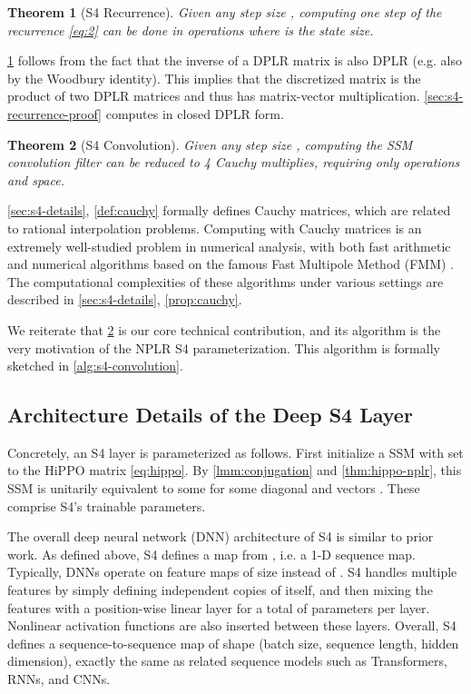 \documentclass{article}
\newtheorem{theorem}{Theorem}
\newcommand{\methodabbrv}{S4}
\begin{document}
\begin{theorem}[\methodabbrv{} Recurrence]\label{thm:s4-recurrence}
  Given any step size , computing one step of the recurrence \eqref{eq:2} can be done in  operations where  is the state size.
\end{theorem}

\cref{thm:s4-recurrence} follows from the fact that the inverse of a DPLR matrix is also DPLR (e.g. also by the Woodbury identity).
This implies that the discretized matrix  is the product of two DPLR matrices and thus has  matrix-vector multiplication.
\cref{sec:s4-recurrence-proof} computes  in closed DPLR form.
\begin{theorem}[\methodabbrv{} Convolution]\label{thm:s4-convolution}
  Given any step size , computing the SSM convolution filter  can be reduced to 4 Cauchy multiplies,
  requiring only
   operations and  space.
\end{theorem}


\cref{sec:s4-details}, \cref{def:cauchy} formally defines Cauchy matrices, which are related to rational interpolation problems.
Computing with Cauchy matrices is an extremely well-studied problem in numerical analysis,
with both fast arithmetic and numerical algorithms based on the famous Fast Multipole Method (FMM)
\citep{pan2001structured,pan2015transformations,pan2017fast}.
The computational complexities of these algorithms under various settings are described in \cref{sec:s4-details}, \cref{prop:cauchy}.

We reiterate that \cref{thm:s4-convolution} is our core technical contribution,
and its algorithm is the very motivation of the NPLR \methodabbrv{} parameterization.
This algorithm is formally sketched in \cref{alg:s4-convolution}.


\subsection{Architecture Details of the Deep \methodabbrv{} Layer}
\label{sec:s4-architecture}

Concretely, an \methodabbrv{} layer is parameterized as follows.
First initialize a SSM with  set to the HiPPO matrix \eqref{eq:hippo}.
By \cref{lmm:conjugation} and \cref{thm:hippo-nplr},
this SSM is unitarily equivalent to some  for some diagonal  and vectors .
These comprise \methodabbrv's  trainable parameters.


The overall deep neural network (DNN) architecture of \methodabbrv{} is similar to prior work.
As defined above,
\methodabbrv{} defines a map from , i.e. a 1-D sequence map.
Typically, DNNs operate on feature maps of size  instead of .
\methodabbrv{} handles multiple features by simply defining  independent copies of itself, and then mixing the  features with a position-wise linear layer for a total of  parameters per layer.
Nonlinear activation functions are also inserted between these layers.
Overall, \methodabbrv{} defines a sequence-to-sequence map of shape (batch size, sequence length, hidden dimension), exactly the same as related sequence models such as Transformers, RNNs, and CNNs.
\end{document}
